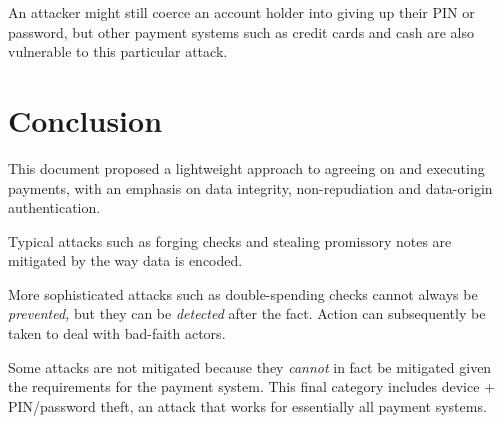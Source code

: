 \documentclass[12pt,a4paper]{article}
\begin{document}
\begin{multicols}{2}
	An attacker might still coerce an account holder into giving up their PIN or password, but other payment systems such as credit cards and cash are also vulnerable to this particular attack.

	\section{Conclusion}

	This document proposed a lightweight approach to agreeing on and executing payments, with an emphasis on data integrity, non-repudiation and data-origin authentication.
	
	Typical attacks such as forging checks and stealing promissory notes are mitigated by the way data is encoded.

	More sophisticated attacks such as double-spending checks cannot always be \emph{prevented,} but they can be \emph{detected} after the fact. Action can subsequently be taken to deal with bad-faith actors.

	Some attacks are not mitigated because they \emph{cannot} in fact be mitigated given the requirements for the payment system. This final category includes device + PIN/password theft, an attack that works for essentially all payment systems.

	
	 

	\end{multicols}
\end{document}
